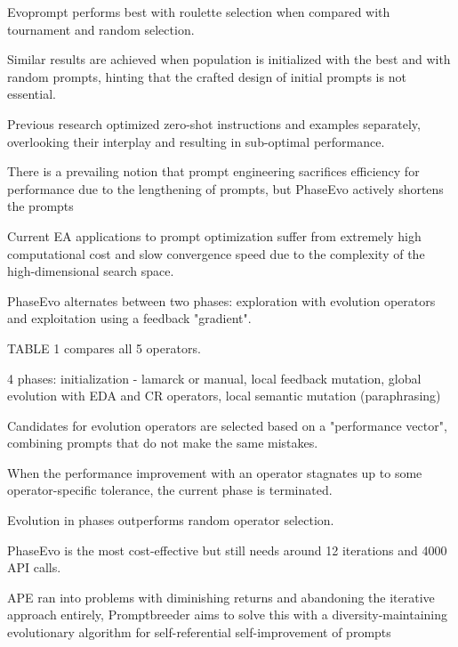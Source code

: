 Evoprompt performs best with roulette selection when compared with tournament and random selection. \cite{guo2024connectinglargelanguagemodels}

Similar results are achieved when population is initialized with the best and with random prompts, hinting that the crafted design of initial prompts is not essential. \cite{guo2024connectinglargelanguagemodels}


Previous research optimized zero-shot instructions and examples separately, overlooking their interplay and resulting in sub-optimal performance. \cite{cui2024phaseevounifiedincontextprompt}

There is a prevailing notion that prompt engineering sacrifices efficiency for performance due to the lengthening of prompts, but PhaseEvo actively shortens the prompts \cite{cui2024phaseevounifiedincontextprompt}

Current EA applications to prompt optimization suffer from extremely high computational cost and slow convergence speed due to the complexity of the high-dimensional search space. \cite{cui2024phaseevounifiedincontextprompt}

PhaseEvo alternates between two phases: exploration with evolution operators and exploitation using a feedback "gradient". \cite{cui2024phaseevounifiedincontextprompt}

TABLE 1  compares all 5 operators.  \cite{cui2024phaseevounifiedincontextprompt}

4 phases: initialization - lamarck or manual, local feedback mutation, global evolution with EDA and CR operators, local semantic mutation (paraphrasing) \cite{cui2024phaseevounifiedincontextprompt}

Candidates for evolution operators are selected based on a "performance vector", combining prompts that do not make the same mistakes.  \cite{cui2024phaseevounifiedincontextprompt}

When the performance improvement with an operator stagnates up to some operator-specific tolerance, the current phase is terminated. \cite{cui2024phaseevounifiedincontextprompt}

Evolution in phases outperforms random operator selection. \cite{cui2024phaseevounifiedincontextprompt}

PhaseEvo is the most cost-effective but still needs around 12 iterations and 4000 API calls. \cite{cui2024phaseevounifiedincontextprompt}


APE \cite{zhou2023largelanguagemodelshumanlevel} ran into problems with diminishing returns and abandoning the iterative approach entirely, Promptbreeder aims to solve this with a diversity-maintaining evolutionary algorithm for self-referential self-improvement of prompts \cite{fernando2023promptbreederselfreferentialselfimprovementprompt}

